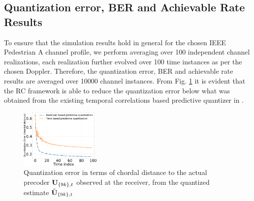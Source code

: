 \documentclass[conference]{IEEEtran}
\begin{document}
{\subsection{Quantization error, BER and Achievable Rate Results}
\label{res}{}
\noindent To ensure that the simulation results hold in general for the chosen IEEE Pedestrian A channel profile, we perform averaging over 100 independent channel realizations, each realization further evolved over 100 time instances as per the chosen Doppler. Therefore, the quantization error, BER and achievable rate results are averaged over 10000 channel instances. From Fig. \ref{qtiz_err} it is evident that the RC framework is able to reduce the quantization error below what was obtained from the existing temporal correlations based predictive quantizer in \cite{6891198}. 
\begin{figure}
\centering
\includegraphics[width=0.35\textwidth]{images/qtizErr.pdf}
\caption{Quantization error in terms of chordal distance to the actual precoder ${\bf U}_{\{9k\},t}$ observed at the receiver, from the quantized estimate $\tilde{{\bf U}}_{\{9k\},t}$}
\label{qtiz_err}
\end{figure}

}
\end{document}
